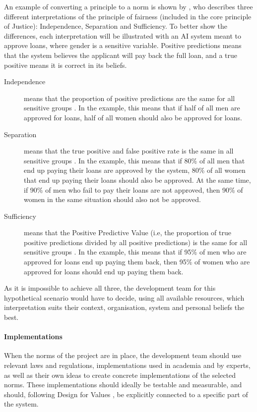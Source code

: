 An example of converting a principle to a norm is shown by \textcite{Benjamins_2019}, who describes three different interpretations of the principle of fairness (included in the core principle of Justice): Independence, Separation and Sufficiency. To better show the differences, each interpretation will be illustrated with an AI system meant to approve loans, where gender is a sensitive variable. Positive predictions means that the system believes the applicant will pay back the full loan, and a true positive means it is correct in its beliefs. 

\begin{description}
    \item[Independence] means that the proportion of positive predictions are the same for all sensitive groups \parencite{Benjamins_2019}. In the example, this means that if half of all men are approved for loans, half of all women should also be approved for loans.
    
    \item[Separation] means that the true positive and false positive rate is the same in all sensitive groups \parencite{Benjamins_2019}. In the example, this means that if 80\% of all men that end up paying their loans are approved by the system, 80\% of all women that end up paying their loans should also be approved. At the same time, if 90\% of men who fail to pay their loans are not approved, then 90\% of women in the same situation should also not be approved.
    
    \item[Sufficiency] means that the Positive Predictive Value (i.e, the proportion of true positive predictions divided by all positive predictions) is the same for all sensitive groups \parencite{Benjamins_2019}. In the example, this means that if 95\% of men who are approved for loans end up paying them back, then 95\% of women who are approved for loans should end up paying them back.
\end{description}
As it is impossible to achieve all three, the development team for this hypothetical scenario would have to decide, using all available resources, which interpretation suits their context, organisation, system and personal beliefs the best.

\paragraph{Implementations}
When the norms of the project are in place, the development team should use relevant laws and regulations, implementations used in academia and by experts, as well as their own ideas to create concrete implementations of the selected norms. These implementations should ideally be testable and measurable, and should, following Design for Values \parencite{Dignum_2019}, be explicitly connected to a specific part of the system.

